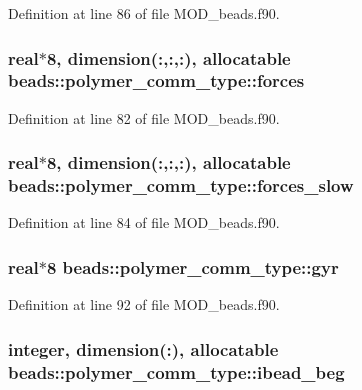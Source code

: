 Definition at line 86 of file M\-O\-D\-\_\-beads.\-f90.

\hypertarget{structbeads_1_1polymer__comm__type_af9ab777fc9978966562ec6660fcf6eb3}{
\subsubsection[{forces}]{\setlength{\rightskip}{0pt plus 5cm}real$\ast$8, dimension(\-:,\-:,\-:), allocatable beads\-::polymer\-\_\-comm\-\_\-type\-::forces}}\label{structbeads_1_1polymer__comm__type_af9ab777fc9978966562ec6660fcf6eb3}


Definition at line 82 of file M\-O\-D\-\_\-beads.\-f90.

\hypertarget{structbeads_1_1polymer__comm__type_a6614d7b1d87de7ddf82f98702d1d8e0c}{
\subsubsection[{forces\-\_\-slow}]{\setlength{\rightskip}{0pt plus 5cm}real$\ast$8, dimension(\-:,\-:,\-:), allocatable beads\-::polymer\-\_\-comm\-\_\-type\-::forces\-\_\-slow}}\label{structbeads_1_1polymer__comm__type_a6614d7b1d87de7ddf82f98702d1d8e0c}


Definition at line 84 of file M\-O\-D\-\_\-beads.\-f90.

\hypertarget{structbeads_1_1polymer__comm__type_ae457aae2d6d4f839bb3edaad4cc13f58}{
\subsubsection[{gyr}]{\setlength{\rightskip}{0pt plus 5cm}real$\ast$8 beads\-::polymer\-\_\-comm\-\_\-type\-::gyr}}\label{structbeads_1_1polymer__comm__type_ae457aae2d6d4f839bb3edaad4cc13f58}


Definition at line 92 of file M\-O\-D\-\_\-beads.\-f90.

\hypertarget{structbeads_1_1polymer__comm__type_afbd32d8fe85cad96e29f843d57d4643d}{
\subsubsection[{ibead\-\_\-beg}]{\setlength{\rightskip}{0pt plus 5cm}integer, dimension(\-:), allocatable beads\-::polymer\-\_\-comm\-\_\-type\-::ibead\-\_\-beg}}\label{structbeads_1_1polymer__comm__type_afbd32d8fe85cad96e29f843d57d4643d}


